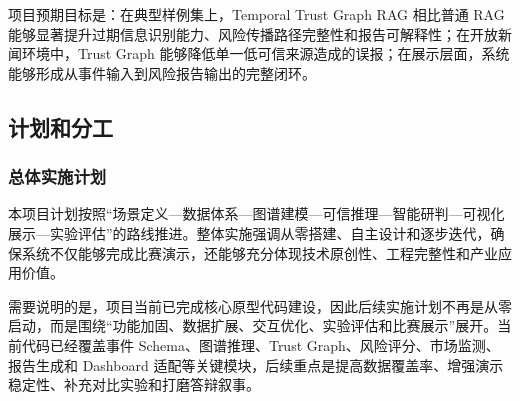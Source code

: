 \documentclass[12pt,a4paper]{article}
\begin{document}
项目预期目标是：在典型样例集上，Temporal Trust Graph RAG 相比普通 RAG 能够显著提升过期信息识别能力、风险传播路径完整性和报告可解释性；在开放新闻环境中，Trust Graph 能够降低单一低可信来源造成的误报；在展示层面，系统能够形成从事件输入到风险报告输出的完整闭环。

\subsection{计划和分工}

\subsubsection{总体实施计划}

本项目计划按照“场景定义—数据体系—图谱建模—可信推理—智能研判—可视化展示—实验评估”的路线推进。整体实施强调从零搭建、自主设计和逐步迭代，确保系统不仅能够完成比赛演示，还能够充分体现技术原创性、工程完整性和产业应用价值。

需要说明的是，项目当前已完成核心原型代码建设，因此后续实施计划不再是从零启动，而是围绕“功能加固、数据扩展、交互优化、实验评估和比赛展示”展开。当前代码已经覆盖事件 Schema、图谱推理、Trust Graph、风险评分、市场监测、报告生成和 Dashboard 适配等关键模块，后续重点是提高数据覆盖率、增强演示稳定性、补充对比实验和打磨答辩叙事。
\end{document}
